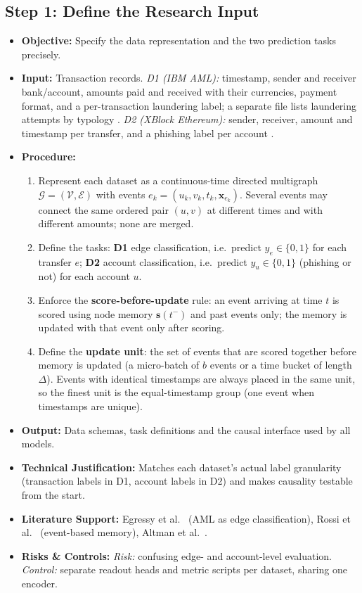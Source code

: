 \documentclass[11pt,a4paper]{article}
\begin{document}
\subsection{Step 1: Define the Research Input}
\begin{itemize}[leftmargin=*]
    \item \textbf{Objective:} Specify the data representation and the two prediction tasks precisely.
    \item \textbf{Input:} Transaction records. \textit{D1 (IBM AML):} timestamp, sender and receiver bank/account, amounts paid and received with their currencies, payment format, and a per-transaction laundering label; a separate file lists laundering attempts by typology \cite{altman2023ibmaml}. \textit{D2 (XBlock Ethereum):} sender, receiver, amount and timestamp per transfer, and a phishing label per account \cite{wu2022phishers}.
    \item \textbf{Procedure:}
    \begin{enumerate}[leftmargin=*]
        \item Represent each dataset as a continuous-time directed multigraph $\mathcal{G}=(\mathcal{V},\mathcal{E})$ with events $e_k=(u_k, v_k, t_k, \mathbf{x}_{e_k})$. Several events may connect the same ordered pair $(u,v)$ at different times and with different amounts; none are merged.
        \item Define the tasks: \textbf{D1} edge classification, i.e.\ predict $y_e\in\{0,1\}$ for each transfer $e$; \textbf{D2} account classification, i.e.\ predict $y_u\in\{0,1\}$ (phishing or not) for each account $u$.
        \item Enforce the \textbf{score-before-update} rule: an event arriving at time $t$ is scored using node memory $\mathbf{s}(t^-)$ and past events only; the memory is updated with that event only after scoring.
        \item Define the \textbf{update unit}: the set of events that are scored together before memory is updated (a micro-batch of $b$ events or a time bucket of length $\Delta$). Events with identical timestamps are always placed in the same unit, so the finest unit is the equal-timestamp group (one event when timestamps are unique).
    \end{enumerate}
    \item \textbf{Output:} Data schemas, task definitions and the causal interface used by all models.
    \item \textbf{Technical Justification:} Matches each dataset's actual label granularity (transaction labels in D1, account labels in D2) and makes causality testable from the start.
    \item \textbf{Literature Support:} Egressy et al.\ \cite{egressy2024multigraph} (AML as edge classification), Rossi et al.\ \cite{rossi2020tgn} (event-based memory), Altman et al.\ \cite{altman2023ibmaml}.
    \item \textbf{Risks \& Controls:} \textit{Risk:} confusing edge- and account-level evaluation. \textit{Control:} separate readout heads and metric scripts per dataset, sharing one encoder.
\end{itemize}
\end{document}

